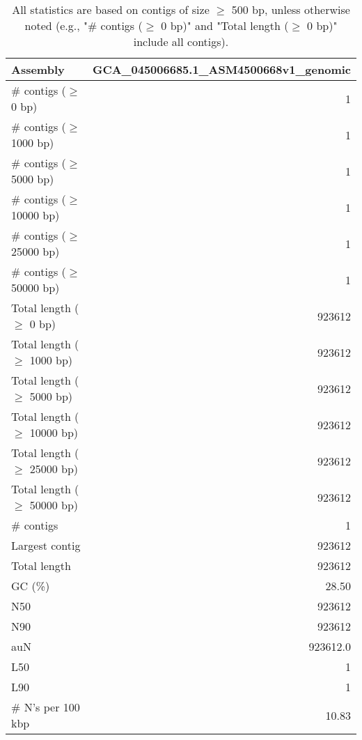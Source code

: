 \documentclass[12pt,a4paper]{article}
\begin{document}
\begin{table}[ht]
\begin{center}
\caption{All statistics are based on contigs of size $\geq$ 500 bp, unless otherwise noted (e.g., "\# contigs ($\geq$ 0 bp)" and "Total length ($\geq$ 0 bp)" include all contigs).}
\begin{tabular}{|l*{1}{|r}|}
\hline
Assembly & GCA\_045006685.1\_ASM4500668v1\_genomic \\ \hline
\# contigs ($\geq$ 0 bp) & 1 \\ \hline
\# contigs ($\geq$ 1000 bp) & 1 \\ \hline
\# contigs ($\geq$ 5000 bp) & 1 \\ \hline
\# contigs ($\geq$ 10000 bp) & 1 \\ \hline
\# contigs ($\geq$ 25000 bp) & 1 \\ \hline
\# contigs ($\geq$ 50000 bp) & 1 \\ \hline
Total length ($\geq$ 0 bp) & 923612 \\ \hline
Total length ($\geq$ 1000 bp) & 923612 \\ \hline
Total length ($\geq$ 5000 bp) & 923612 \\ \hline
Total length ($\geq$ 10000 bp) & 923612 \\ \hline
Total length ($\geq$ 25000 bp) & 923612 \\ \hline
Total length ($\geq$ 50000 bp) & 923612 \\ \hline
\# contigs & 1 \\ \hline
Largest contig & 923612 \\ \hline
Total length & 923612 \\ \hline
GC (\%) & 28.50 \\ \hline
N50 & 923612 \\ \hline
N90 & 923612 \\ \hline
auN & 923612.0 \\ \hline
L50 & 1 \\ \hline
L90 & 1 \\ \hline
\# N's per 100 kbp & 10.83 \\ \hline
\end{tabular}
\end{center}
\end{table}
\end{document}
